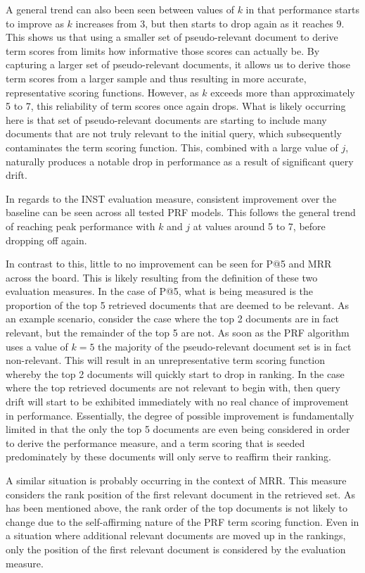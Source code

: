 \documentclass[a4paper]{report}
\begin{document}
A general trend can also been seen between values of $k$ in that performance starts to improve as $k$ increases from 3, but then starts to drop again as it reaches $9$. This shows us that using a smaller set of pseudo-relevant document to derive term scores from limits how informative those scores can actually be. By capturing a larger set of pseudo-relevant documents, it allows us to derive those term scores from a larger sample and thus resulting in more accurate, representative scoring functions. However, as $k$ exceeds more than approximately 5 to 7, this reliability of term scores once again drops. What is likely occurring here is that set of pseudo-relevant documents are starting to include many documents that are not truly relevant to the initial query, which subsequently contaminates the term scoring function. This, combined with a large value of $j$, naturally produces a notable drop in performance as a result of significant query drift.

In regards to the INST evaluation measure, consistent improvement over the baseline can be seen across all tested PRF models. This follows the general trend of reaching peak performance with $k$ and $j$ at values around 5 to 7, before dropping off again. 

In contrast to this, little to no improvement can be seen for P@5 and MRR across the board. This is likely resulting from the definition of these two evaluation measures. In the case of P@5, what is being measured is the proportion of the top 5 retrieved documents that are deemed to be relevant. As an example scenario, consider the case where the top 2 documents are in fact relevant, but the remainder of the top 5 are not. As soon as the PRF algorithm uses a value of $k = 5$ the majority of the pseudo-relevant document set is in fact non-relevant. This will result in an unrepresentative term scoring function whereby the top 2 documents will quickly start to drop in ranking. In the case where the top retrieved documents are not relevant to begin with, then query drift will start to be exhibited immediately with no real chance of improvement in performance. Essentially, the degree of possible improvement is fundamentally limited in that the only the top 5 documents are even being considered in order to derive the performance measure, and a term scoring that is seeded predominately by these documents will only serve to reaffirm their ranking.

A similar situation is probably occurring in the context of MRR. This measure considers the rank position of the first relevant document in the retrieved set. As has been mentioned above, the rank order of the top documents is not likely to change due to the self-affirming nature of the PRF term scoring function. Even in a situation where additional relevant documents are moved up in the rankings, only the position of the first relevant document is considered by the evaluation measure.
\end{document}
